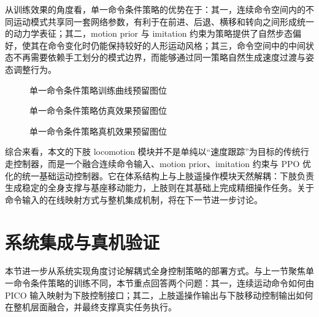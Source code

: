 从训练效果的角度看，单一命令条件策略的优势在于：其一，连续命令空间内的不同运动模式共享同一套网络参数，有利于在前进、后退、横移和转向之间形成统一的动力学表征；其二，motion prior 与 imitation 约束为策略提供了自然步态偏好，使其在命令变化时仍能保持较好的人形运动风格；其三，命令空间中的中间状态不再需要依赖手工划分的模式边界，而能够通过同一策略自然生成速度过渡与姿态调整行为。

\begin{figure}[H]
    \centering
    \caption{单一命令条件策略训练曲线预留图位}
    \label{fig:single-policy-training-placeholder}
\end{figure}

\begin{figure}[H]
    \centering
    \caption{单一命令条件策略仿真效果预留图位}
    \label{fig:single-policy-sim-placeholder}
\end{figure}

\begin{figure}[H]
    \centering
    \caption{单一命令条件策略真机效果预留图位}
    \label{fig:single-policy-real-placeholder}
\end{figure}

综合来看，本文的下肢 locomotion 模块并不是单纯以“速度跟踪”为目标的传统行走控制器，而是一个融合连续命令输入、motion prior、imitation 约束与 PPO 优化的统一基础运动控制器。它在体系结构上与上肢遥操作模块天然解耦：下肢负责生成稳定的全身支撑与基座移动能力，上肢则在其基础上完成精细操作任务。关于命令输入的在线映射方式与整机集成机制，将在下一节进一步讨论。


\section{系统集成与真机验证}

本节进一步从系统实现角度讨论解耦式全身控制策略的部署方式。与上一节聚焦单一命令条件策略的训练不同，本节重点回答两个问题：其一，连续运动命令如何由 PICO 输入映射为下肢控制接口；其二，上肢遥操作输出与下肢移动控制输出如何在整机层面融合，并最终支撑真实任务执行。

